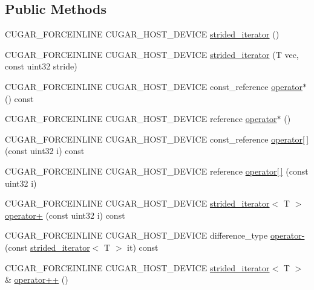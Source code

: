 \subsection*{Public Methods}
\begin{DoxyCompactItemize}
\item 
C\+U\+G\+A\+R\+\_\+\+F\+O\+R\+C\+E\+I\+N\+L\+I\+NE C\+U\+G\+A\+R\+\_\+\+H\+O\+S\+T\+\_\+\+D\+E\+V\+I\+CE \hyperlink{structcugar_1_1strided__iterator_ab93fbb6b2124eeab54ea02d6c6f0d129}{strided\+\_\+iterator} ()
\item 
C\+U\+G\+A\+R\+\_\+\+F\+O\+R\+C\+E\+I\+N\+L\+I\+NE C\+U\+G\+A\+R\+\_\+\+H\+O\+S\+T\+\_\+\+D\+E\+V\+I\+CE \hyperlink{structcugar_1_1strided__iterator_aab0d364409d09a7abde195d187e598e5}{strided\+\_\+iterator} (T vec, const uint32 stride)
\item 
C\+U\+G\+A\+R\+\_\+\+F\+O\+R\+C\+E\+I\+N\+L\+I\+NE C\+U\+G\+A\+R\+\_\+\+H\+O\+S\+T\+\_\+\+D\+E\+V\+I\+CE const\+\_\+reference \hyperlink{structcugar_1_1strided__iterator_a8fe9c22e7edb3a7ab71b8a054b199e34}{operator$\ast$} () const
\item 
C\+U\+G\+A\+R\+\_\+\+F\+O\+R\+C\+E\+I\+N\+L\+I\+NE C\+U\+G\+A\+R\+\_\+\+H\+O\+S\+T\+\_\+\+D\+E\+V\+I\+CE reference \hyperlink{structcugar_1_1strided__iterator_a825c448a66b086555e4cbe00a9be6d57}{operator$\ast$} ()
\item 
C\+U\+G\+A\+R\+\_\+\+F\+O\+R\+C\+E\+I\+N\+L\+I\+NE C\+U\+G\+A\+R\+\_\+\+H\+O\+S\+T\+\_\+\+D\+E\+V\+I\+CE const\+\_\+reference \hyperlink{structcugar_1_1strided__iterator_a81a1d3212d3e701091eab2dc7c71e8bf}{operator\mbox{[}$\,$\mbox{]}} (const uint32 i) const
\item 
C\+U\+G\+A\+R\+\_\+\+F\+O\+R\+C\+E\+I\+N\+L\+I\+NE C\+U\+G\+A\+R\+\_\+\+H\+O\+S\+T\+\_\+\+D\+E\+V\+I\+CE reference \hyperlink{structcugar_1_1strided__iterator_a136a837540ffa2511fc6923be7360071}{operator\mbox{[}$\,$\mbox{]}} (const uint32 i)
\item 
C\+U\+G\+A\+R\+\_\+\+F\+O\+R\+C\+E\+I\+N\+L\+I\+NE C\+U\+G\+A\+R\+\_\+\+H\+O\+S\+T\+\_\+\+D\+E\+V\+I\+CE \hyperlink{structcugar_1_1strided__iterator}{strided\+\_\+iterator}$<$ T $>$ \hyperlink{structcugar_1_1strided__iterator_ae8d69a6cd4d09d11d0f5f94e2da74890}{operator+} (const uint32 i) const
\item 
C\+U\+G\+A\+R\+\_\+\+F\+O\+R\+C\+E\+I\+N\+L\+I\+NE C\+U\+G\+A\+R\+\_\+\+H\+O\+S\+T\+\_\+\+D\+E\+V\+I\+CE difference\+\_\+type \hyperlink{structcugar_1_1strided__iterator_aeaf1a5c948f85a27d47739233ff896ef}{operator-\/} (const \hyperlink{structcugar_1_1strided__iterator}{strided\+\_\+iterator}$<$ T $>$ it) const
\item 
C\+U\+G\+A\+R\+\_\+\+F\+O\+R\+C\+E\+I\+N\+L\+I\+NE C\+U\+G\+A\+R\+\_\+\+H\+O\+S\+T\+\_\+\+D\+E\+V\+I\+CE \hyperlink{structcugar_1_1strided__iterator}{strided\+\_\+iterator}$<$ T $>$ \& \hyperlink{structcugar_1_1strided__iterator_acd0748fb742a987def5bb74952c769d7}{operator++} ()
\end{DoxyCompactItemize}
